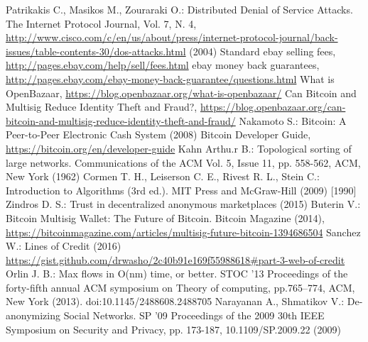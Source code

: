 \documentclass[11pt]{llncs}
\theoremstyle{definition}
\begin{document}
  \begin{thebibliography}{20}
     Patrikakis C., Masikos M., Zouraraki O.: Distributed Denial of Service Attacks. The Internet Protocol Journal, Vol. 7,
     N. 4,
     \url{http://www.cisco.com/c/en/us/about/press/internet-protocol-journal/back-issues/table-contents-30/dos-attacks.html}
     (2004)
     Standard ebay selling fees, \url{http://pages.ebay.com/help/sell/fees.html}
     ebay money back guarantees, \url{http://pages.ebay.com/ebay-money-back-guarantee/questions.html}
     What is OpenBazaar, \url{https://blog.openbazaar.org/what-is-openbazaar/}
     Can Bitcoin and Multisig Reduce Identity Theft and Fraud?,
     \url{https://blog.openbazaar.org/can-bitcoin-and-multisig-reduce-identity-theft-and-fraud/}
     Nakamoto S.: Bitcoin: A Peer-to-Peer Electronic Cash System (2008)
     Bitcoin Developer Guide, \url{https://bitcoin.org/en/developer-guide}
     Kahn Arthu.r B.: Topological sorting of large networks. Communications of the ACM Vol. 5, Issue 11, pp. 558-562, ACM,
     New York (1962)
     Cormen T. H., Leiserson C. E., Rivest R. L., Stein C.: Introduction to Algorithms (3rd ed.). MIT Press and McGraw-Hill
     (2009) [1990]
     Zindros D. S.: Trust in decentralized anonymous marketplaces (2015)
     Buterin V.: Bitcoin Multisig Wallet: The Future of Bitcoin. Bitcoin Magazine (2014),
     \url{https://bitcoinmagazine.com/articles/multisig-future-bitcoin-1394686504}
     Sanchez W.: Lines of Credit (2016) \url{https://gist.github.com/drwasho/2c40b91e169f55988618#part-3-web-of-credit}
     Orlin J. B.: Max flows in O(nm) time, or better. STOC '13 Proceedings of the forty-fifth annual ACM symposium on Theory
     of computing, pp.765–774, ACM, New York (2013). doi:10.1145/2488608.2488705
     Narayanan A., Shmatikov V.: De-anonymizing Social Networks. SP '09 Proceedings of the 2009 30th IEEE Symposium on
     Security and Privacy, pp. 173-187, 10.1109/SP.2009.22 (2009)
  \end{thebibliography}
\end{document}
